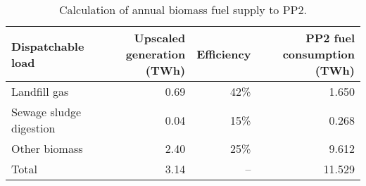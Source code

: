 \begin{table}[htbp]
	\caption{Calculation of annual biomass fuel supply to PP2.}
	\label{tbl:BM_supply_calc}
	\centering
	\begin{tabular}{@{}lrrr@{}}
		\toprule
		Dispatchable load & Upscaled generation (TWh) & Efficiency & PP2 fuel consumption (TWh) \\ \midrule
		Landfill gas & 0.69 & 42\% & 1.650 \\
		Sewage sludge digestion & 0.04 & 15\% & 0.268 \\
		Other biomass & 2.40 & 25\% & 9.612 \\ \midrule
		Total & 3.14 & -- & 11.529 \\ \bottomrule
	\end{tabular}
\end{table}